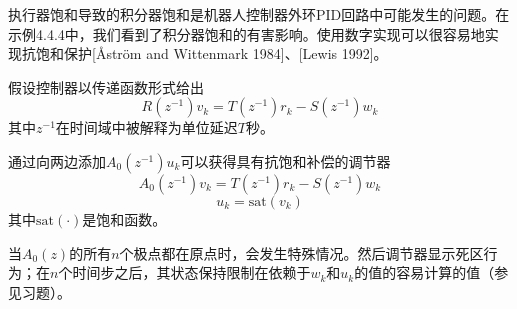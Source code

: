 \documentclass[UTF8]{ctexart}
\theoremstyle{definition}
\begin{document}
执行器饱和导致的积分器饱和是机器人控制器外环PID回路中可能发生的问题。在示例4.4.4中，我们看到了积分器饱和的有害影响。使用数字实现可以很容易地实现抗饱和保护[Åström and Wittenmark 1984]、[Lewis 1992]。

假设控制器以传递函数形式给出
\begin{equation}\label{eq:4.5.13}
    R(z^{-1})v_k = T(z^{-1})r_k - S(z^{-1})w_k
\end{equation}
其中$z^{-1}$在时间域中被解释为单位延迟$T$秒。

通过向两边添加$A_0(z^{-1})u_k$可以获得具有抗饱和补偿的调节器
\begin{equation}\label{eq:4.5.14}
    A_0(z^{-1})v_k = T(z^{-1})r_k - S(z^{-1})w_k
\end{equation}
\begin{equation}\label{eq:4.5.15}
    u_k = \mathrm{sat}(v_k)
\end{equation}
其中$\mathrm{sat}(\cdot)$是饱和函数。

当$A_0(z)$的所有$n$个极点都在原点时，会发生特殊情况。然后调节器显示死区行为；在$n$个时间步之后，其状态保持限制在依赖于$w_k$和$u_k$的值的容易计算的值（参见习题）。
\end{document}
